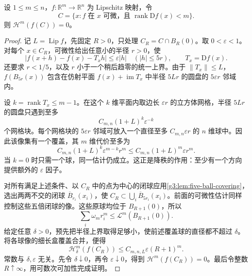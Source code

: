\begin{lemma}\label{g3:lem:rank-deficient-image-null}
	设 \(1\le m\le n\)，\(f:\mathbb R^m\to\mathbb R^n\) 为 Lipschitz 映射，令
	\[
		C=\{x:f\text{ 在 }x\text{ 可微，且 }\operatorname{rank}\mathrm Df(x)<m\}.
	\]
	则 \(\mathcal H^m(f(C))=0\)。
\end{lemma}
\begin{proof}
	记 \(L=\operatorname{Lip}f\)，先固定 \(R>0\)，只处理 \(C_R=C\cap B_R(0)\)。取 \(0<\varepsilon<1\)。对每个 \(x\in C_R\)，可微性给出任意小的半径 \(r>0\)，使
	\[
		|f(x+h)-f(x)-T_xh|\le\varepsilon|h|\quad(|h|\le5r),\qquad T_x=\mathrm Df(x).
	\]
	还要求 \(r<1/5\)，以及 \(r\) 小于一个稍后趋零的统一上界。由于 \(\lVert T_x\rVert\le L\)，\(f(B_{5r}(x))\) 包含在仿射平面 \(f(x)+\operatorname{im}T_x\) 中半径 \(5Lr\) 的圆盘的 \(5\varepsilon r\) 邻域内。

	设 \(k=\operatorname{rank}T_x\le m-1\)。在这个 \(k\) 维平面内取边长 \(\varepsilon r\) 的立方体网格，半径 \(5Lr\) 的圆盘只遇到至多
	\[
		C_{m,n}(1+L)^k\varepsilon^{-k}
	\]
	个网格块。每个网格块的 \(5\varepsilon r\) 邻域可放入一个直径至多 \(C_{m,n}\varepsilon r\) 的 \(n\) 维球中。因此该像集有一个覆盖，其 \(m\) 维代价至多为
	\[
		C_{m,n}(1+L)^k\varepsilon^{m-k}r^m
		\le C_{m,n}(1+L)^m\varepsilon r^m.
	\]
	当 \(k=0\) 时只需一个球，同一估计仍成立。这正是降秩的作用：至少有一个方向提供额外的 \(\varepsilon\) 因子。

	对所有满足上述条件、以 \(C_R\) 中的点为中心的闭球应用\cref{g3:lem:five-ball-covering}，选出两两不交的闭球 \(\overline B_{r_i}(x_i)\)，使 \(C_R\subset\bigcup_i\overline B_{5r_i}(x_i)\)。前面的可微性估计同样控制这些五倍闭球的像。这些原球均位于 \(B_{R+1}(0)\)，所以
	\[
		\sum_i\omega_m r_i^m\le\mathcal L^m(B_{R+1}(0)).
	\]
	给定任意 \(\delta>0\)，预先把半径上界取得足够小，使前述覆盖球的直径都不超过 \(\delta\)。将各球像的细长盒覆盖合并，便得
	\[
		\mathcal H^m_\delta(f(C_R))
		\le C_{m,n,L}\varepsilon(R+1)^m.
	\]
	常数与 \(\delta,\varepsilon\) 无关。先令 \(\delta\downarrow0\)，再令 \(\varepsilon\downarrow0\)，得到 \(\mathcal H^m(f(C_R))=0\)。最后令整数 \(R\uparrow\infty\)，用可数次可加性完成证明。
\end{proof}

